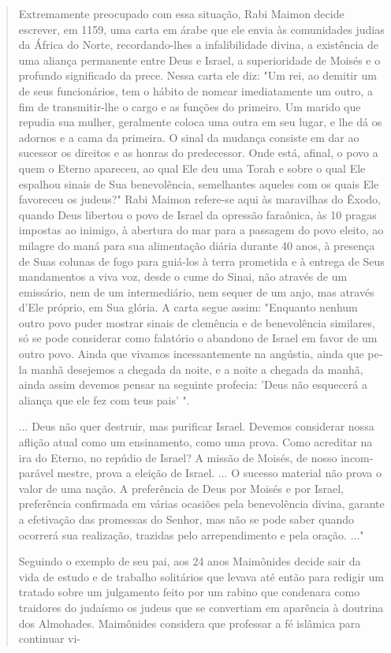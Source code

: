 \begin{quote}
Extremamente preocupado com essa situação, Rabi Maimon decide escrever,
em 1159, uma carta em árabe que ele envia às comunidades judias da
África do Norte, recordando-lhes a infalibilidade divina, a existência
de uma aliança permanente entre Deus e Israel, a superioridade de Moisés
e o profun­do significado da prece. Nessa carta ele diz: "Um rei, ao
demitir um de seus funcionários, tem o hábito de nomear imediatamente um
outro, a fim de transmitir-lhe o cargo e as funções do primeiro. Um
marido que repudia sua mulher, geralmente coloca uma outra em seu lugar,
e lhe dá os adornos e a ca­ma da primeira. O sinal da mudança consiste
em dar ao sucessor os direitos e as honras do predecessor. Onde está,
afinal, o povo a quem o Eterno apare­ceu, ao qual Ele deu uma Torah e
sobre o qual Ele espalhou sinais de Sua bene­volência, semelhantes
aqueles com os quais Ele favoreceu os judeus?" Rabi Mai­mon refere-se
aqui às maravilhas do Êxodo, quando Deus libertou o povo de Israel da
opressão faraônica, às 10 pragas impostas ao inimigo, à abertura do mar
para a passagem do povo eleito, ao milagre do maná para sua alimentação
diária durante 40 anos, à presença de Suas colunas de fogo para guiá-los
à terra prometida e à entrega de Seus mandamentos a viva voz, desde o
cume do Si­nai, não através de um emissário, nem de um intermediário,
nem sequer de um anjo, mas através d'Ele próprio, em Sua glória. A carta
segue assim: "Enquanto nenhum outro povo puder mostrar sinais de
clemência e de benevolência simi­lares, só se pode considerar como
falatório o abandono de Israel em favor de um outro povo. Ainda que
vivamos incessantemente na angústia, ainda que pe­la manhã desejemos a
chegada da noite, e a noite a chegada da manhã, ainda assim devemos
pensar na seguinte profecia: 'Deus não esquecerá a aliança que ele fez
com teus pais' ".

... Deus não quer destruir, mas purificar Israel. Devemos conside­rar
nossa aflição atual como um ensinamento, como uma prova. Como acredi­tar
na ira do Eterno, no repúdio de Israel? A missão de Moisés, de nosso
incom­parável mestre, prova a eleição de Israel. ... O sucesso material
não prova o valor de uma nação. A preferência de Deus por Moisés e por
Israel, preferência confirmada em várias ocasiões pela benevolência
divina, garante a efetivação das promessas do Senhor, mas não se pode
saber quando ocorrerá sua realiza­ção, trazidas pelo arrependimento e
pela oração. ..."

Seguindo o exemplo de seu pai, aos 24 anos Maimônides decide sair da
vida de estudo e de trabalho solitários que levava até então para
redigir um tratado sobre um julgamento feito por um rabino que condenara
como traido­res do judaísmo os judeus que se convertiam em aparência à
doutrina dos Al­mohades. Maimônides considera que professar a fé
islâmica para continuar vi-


\end{quote}

